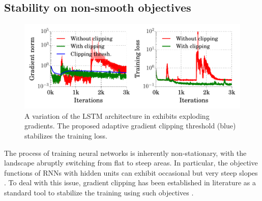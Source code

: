\subsection{Stability on non-smooth objectives}
\label{sec:stability}

\begin{figure}
\centering
  \includegraphics[width=\linewidth]{experiment_results/clipping_example.pdf} 
\caption{A variation of the LSTM architecture in \citep{zhu2016trained} exhibits exploding gradients.
The proposed adaptive gradient clipping threshold (blue) stabilizes the training loss.}
\label{fig:stability}
\end{figure}

The process of training neural networks is inherently non-stationary, with the landscape abruptly switching from flat to steep areas. 
In particular, the objective functions of RNNs with hidden units can exhibit occasional but very steep slopes \citep{pascanu2013difficulty,szegedy2013intriguing}.
To deal with this issue, gradient clipping has been established in literature as a standard tool to stabilize the training using such objectives \citep{pascanu2013difficulty,Goodfellow-et-al-2016,gehring2017convolutional}. 

